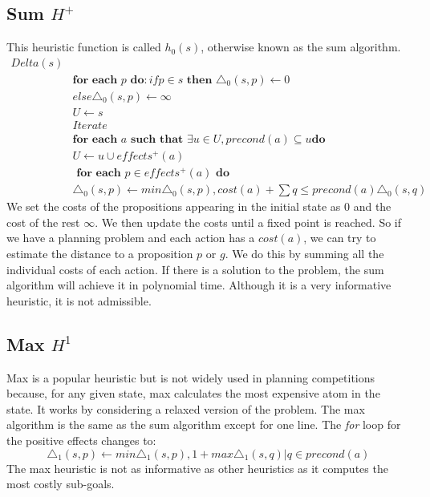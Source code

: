 \subsection{Sum $H^+$}
This heuristic function is called $h_0(s)$, otherwise known as the sum algorithm.
\begin{equation}
\begin{aligned}
Delta(s)\\
  & \textbf{for each } p \textbf{ do}: if p \in s \textbf{ then } \triangle_0 (s,p) \leftarrow 0 \\
  & else \triangle_0 (s,p) \leftarrow \infty \\
  & U \leftarrow {s}\\
  & Iterate\\
  & \textbf{for each } a \textbf{ such that } \exists u \in U, precond(a) \subseteq u \textbf{do}\\
  & U \leftarrow {u} \cup effects^+(a)\\
  & \textbf{ for each } p \in effects^+(a) \textbf{ do}\\
  & \triangle_0 (s,p) \leftarrow min {\triangle_0 (s,p), cost(a) + \sum q \leq precond(a) \triangle_0 (s,q)}
\end{aligned}
\end{equation}
We set the costs of the propositions appearing in the initial state as 0 and the cost of the rest $\infty$. We then update the costs until a fixed point is reached. So if we have a planning problem and each action has a $cost(a)$, we can try to estimate the distance to a proposition $p$ or $g$. We do this by summing all the individual costs of each action.\cite{PlanningGraphs} If there is a solution to the problem, the sum algorithm will achieve it in polynomial time. Although it is a very informative heuristic, it is not admissible. 
\subsection{Max $H^1$}
Max is a popular heuristic but is not widely used in planning competitions because, for any given state, max calculates the most expensive atom in the state. It works by considering a relaxed version of the problem. 
The max algorithm is the same as the sum algorithm except for one line.\cite{PlanningBook} The \textit{for} loop for the positive effects changes to:
\begin{equation}
\triangle_1 (s,p) \leftarrow min{ \triangle_1 (s,p), 1 + max{\triangle_1 (s,q) | q \in precond(a)}}
\end{equation}
The max heuristic is not as informative as other heuristics as it computes the most costly sub-goals. 

